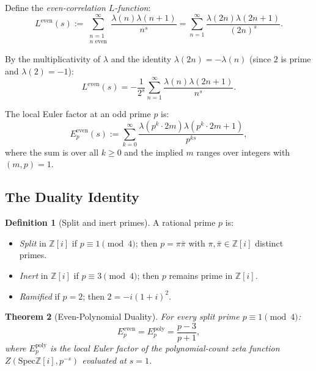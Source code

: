 \documentclass[11pt,a4paper]{article}
\theoremstyle{plain}
\newtheorem{theorem}{Theorem}[section]
\theoremstyle{definition}
\newtheorem{definition}[theorem]{Definition}
\newcommand{\Spec}{\mathrm{Spec}}
\newcommand{\ZZ}{\mathbb{Z}}
\begin{document}
Define the \emph{even-correlation $L$-function}:
\begin{equation}
\label{eq:even-corr-L}
L^{\mathrm{even}}(s) := \sum_{\substack{n=1 \\ n \text{ even}}}^\infty \frac{\lambda(n)\lambda(n+1)}{n^s} = \sum_{n=1}^\infty \frac{\lambda(2n)\lambda(2n+1)}{(2n)^s}.
\end{equation}

By the multiplicativity of $\lambda$ and the identity $\lambda(2n) = -\lambda(n)$ (since $2$ is prime and $\lambda(2) = -1$):
\[
L^{\mathrm{even}}(s) = -\frac{1}{2^s} \sum_{n=1}^\infty \frac{\lambda(n)\lambda(2n+1)}{n^s}.
\]

The local Euler factor at an odd prime $p$ is:
\begin{equation}
\label{eq:local-even}
E_p^{\mathrm{even}}(s) := \sum_{k=0}^\infty \frac{\lambda(p^k \cdot 2m)\lambda(p^k \cdot 2m + 1)}{p^{ks}},
\end{equation}
where the sum is over all $k \geq 0$ and the implied $m$ ranges over integers with $(m, p) = 1$.

\subsection{The Duality Identity}

\begin{definition}[Split and inert primes]
\label{def:split-inert}
A rational prime $p$ is:
\begin{itemize}
\item \emph{Split} in $\ZZ[i]$ if $p \equiv 1 \pmod{4}$; then $p = \pi \bar{\pi}$ with $\pi, \bar{\pi} \in \ZZ[i]$ distinct primes.
\item \emph{Inert} in $\ZZ[i]$ if $p \equiv 3 \pmod{4}$; then $p$ remains prime in $\ZZ[i]$.
\item \emph{Ramified} if $p = 2$; then $2 = -i(1+i)^2$.
\end{itemize}
\end{definition}

\begin{theorem}[Even-Polynomial Duality]
\label{thm:duality}
For every split prime $p \equiv 1 \pmod{4}$:
\begin{equation}
\label{eq:duality}
E_p^{\mathrm{even}} = E_p^{\mathrm{poly}} = \frac{p - 3}{p + 1},
\end{equation}
where $E_p^{\mathrm{poly}}$ is the local Euler factor of the polynomial-count zeta function $Z(\Spec \ZZ[i], p^{-s})$ evaluated at $s = 1$.
\end{theorem}
\end{document}

